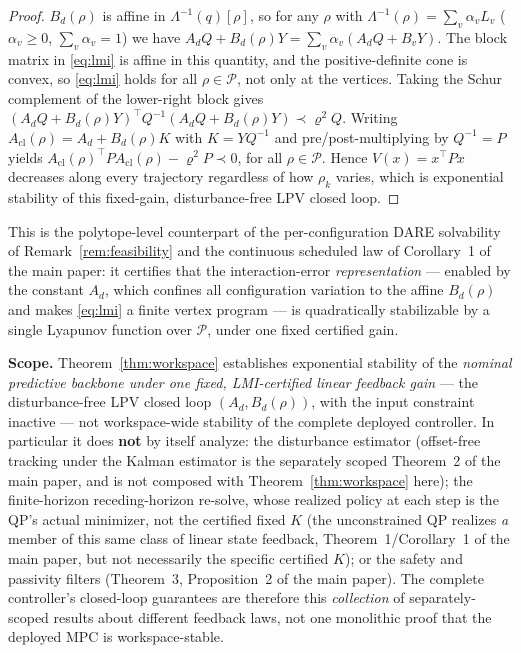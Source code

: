 \documentclass[journal]{IEEEtran}
\newcommand{\Laminv}{\Lambda^{-1}(q)}
\begin{document}
\begin{proof}
$B_d(\rho)$ is affine in $\Laminv[\rho]$, so for any $\rho$ with
$\Lambda^{-1}(\rho)=\sum_v\alpha_vL_v$ ($\alpha_v\ge0$,
$\sum_v\alpha_v=1$) we have
$A_dQ+B_d(\rho)Y=\sum_v\alpha_v(A_dQ+B_vY)$. The block matrix in
\eqref{eq:lmi} is affine in this quantity, and the positive-definite
cone is convex, so \eqref{eq:lmi} holds for all $\rho\in\mathcal P$, not
only at the vertices. Taking the Schur complement of the lower-right
block gives
$(A_dQ+B_d(\rho)Y)^\top Q^{-1}(A_dQ+B_d(\rho)Y)\prec\varrho^2Q$.
Writing $A_\text{cl}(\rho)=A_d+B_d(\rho)K$ with $K=YQ^{-1}$ and
pre/post-multiplying by $Q^{-1}=P$ yields
$A_\text{cl}(\rho)^\top PA_\text{cl}(\rho)-\varrho^2P\prec0$, for
all $\rho\in\mathcal P$. Hence $V(x)=x^\top Px$ decreases along every
trajectory regardless of how $\rho_k$ varies, which is exponential
stability of this fixed-gain, disturbance-free LPV closed loop.
\end{proof}

This is the polytope-level counterpart of the per-configuration DARE
solvability of Remark~\ref{rem:feasibility} and the continuous scheduled
law of Corollary~1 of the main paper: it certifies that the
interaction-error \emph{representation} --- enabled by the constant
$A_d$, which confines all configuration variation to the affine
$B_d(\rho)$ and makes \eqref{eq:lmi} a finite vertex program --- is
quadratically stabilizable by a single Lyapunov function over
$\mathcal P$, under one fixed certified gain.

\textbf{Scope.} Theorem~\ref{thm:workspace} establishes exponential
stability of the \emph{nominal predictive backbone under one fixed,
LMI-certified linear feedback gain} --- the disturbance-free LPV closed
loop $(A_d,B_d(\rho))$, with the input constraint inactive --- not
workspace-wide stability of the complete deployed controller. In
particular it does \textbf{not} by itself analyze: the disturbance
estimator (offset-free tracking under the Kalman estimator is the
separately scoped Theorem~2 of the main paper, and is not composed with
Theorem~\ref{thm:workspace} here); the finite-horizon receding-horizon re-solve, whose
realized policy at each step is the QP's actual minimizer, not the
certified fixed $K$ (the unconstrained QP realizes \emph{a} member of
this same class of linear state feedback, Theorem~1/Corollary~1 of the
main paper, but not necessarily the specific certified $K$); or the
safety and passivity filters (Theorem~3, Proposition~2 of the main
paper). The complete controller's closed-loop guarantees are therefore
this \emph{collection} of separately-scoped results about different
feedback laws, not one monolithic proof that the deployed MPC is
workspace-stable.
\end{document}
